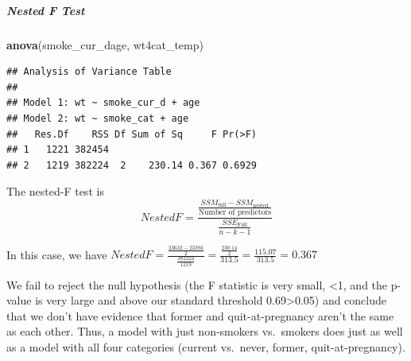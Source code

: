 \documentclass[]{article}
\newenvironment{Shaded}{\begin{snugshade}}{\end{snugshade}}
\newcommand{\KeywordTok}[1]{\textcolor[rgb]{0.13,0.29,0.53}{\textbf{#1}}}
\newcommand{\NormalTok}[1]{#1}
\let\oldsubparagraph\subparagraph
\renewcommand{\subparagraph}[1]{\oldsubparagraph{#1}\mbox{}}
\begin{document}
\hypertarget{nested-f-test}{%
\subparagraph{Nested F Test}\label{nested-f-test}}

\begin{Shaded}
\begin{Highlighting}[]
\KeywordTok{anova}\NormalTok{(smoke_cur_dage, wt4cat_temp)}
\end{Highlighting}
\end{Shaded}

\begin{verbatim}
## Analysis of Variance Table
## 
## Model 1: wt ~ smoke_cur_d + age
## Model 2: wt ~ smoke_cat + age
##   Res.Df    RSS Df Sum of Sq     F Pr(>F)
## 1   1221 382454                          
## 2   1219 382224  2    230.14 0.367 0.6929
\end{verbatim}

The nested-F test is
\[Nested F = \frac{\frac{SSM_\text{full}-SSM_\text{nested}}{\text{Number of predictors}}}{\frac{SSE_\text{Full}}{n-k-1}}\]

In this case, we have
\(Nested F = \frac{\frac{23632-23393}{2}}{\frac{382224}{1219}} = \frac{\frac{230.14}{2}}{313.5} = \frac{115.07}{313.5} = 0.367\)

We fail to reject the null hypothesis (the F statistic is very small,
\textless{}1, and the p-value is very large and above our standard
threshold 0.69\textgreater{}0.05) and conclude that we don't have
evidence that former and quit-at-pregnancy aren't the same as each
other. Thus, a model with just non-smokers vs.~smokers does just as well
as a model with all four categories (current vs.~never, former,
quit-at-pregnancy).
\end{document}
